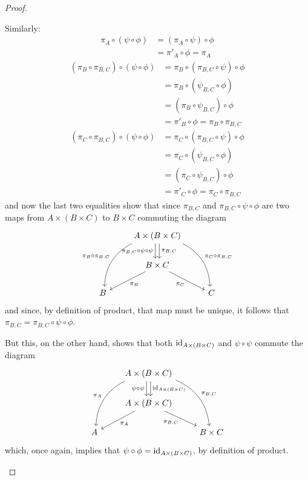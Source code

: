 \begin{proof}
\begin{enumerate}[(a)]
		Similarly:
		\begin{align*}
			\pi_A\circ(\psi\circ\phi)&=(\pi_A\circ\psi)\circ\phi\\
			&=\pi'_A\circ\phi=\pi_A
		\end{align*}
		\begin{align*}
			(\pi_B\circ\pi_{B,C})\circ(\psi\circ\phi)&=\pi_B\circ(\pi_{B,C}\circ\psi)\circ\phi\\
			&=\pi_B\circ(\psi_{B,C}\circ\phi)\\
			&=(\pi_B\circ\psi_{B,C})\circ\phi\\
			&=\pi'_B\circ\phi=\pi_B\circ\pi_{B,C}
		\end{align*}
		\begin{align*}
		(\pi_C\circ\pi_{B,C})\circ(\psi\circ\phi)&=\pi_C\circ(\pi_{B,C}\circ\psi)\circ\phi\\
		&=\pi_C\circ(\psi_{B,C}\circ\phi)\\
		&=(\pi_C\circ\psi_{B,C})\circ\phi\\
		&=\pi'_C\circ\phi=\pi_C\circ\pi_{B,C}
		\end{align*}and now the last two equalities show that since $\pi_{B,C}$ and $\pi_{B,C}\circ\psi\circ\phi$ are two maps from $A\times(B\times C)$ to $B\times C$ commuting the diagram
		\[\begin{tikzcd}
		& A\times(B\times C) \arrow[ldd, "{\pi_B\circ\pi_{B,C}}"', bend right] \arrow[d, "{\pi_{B,C}}",shift left] \arrow[rdd, "{\pi_C\circ\pi_{B,C}}", bend left] \arrow[d, "{\pi_{B,C}\circ\psi\circ\psi}"',shift right] &   \\
		& B\times C \arrow[ld, "\pi_B"] \arrow[rd, "\pi_C"']                                                                                                                                       &   \\
		B &                                                                                                                                                                                          & C
		\end{tikzcd}\]and since, by definition of product, that map must be unique, it follows that $\pi_{B,C}=\pi_{B,C}\circ\psi\circ\phi$.
		
		But this, on the other hand, shows that both ${\rm id}_{A\times(B\times C)}$ and $\psi\circ\psi$ commute the diagram
		\[\begin{tikzcd}
		& A\times(B\times C) \arrow[ldd, "\pi_A"', bend right] \arrow[d, "{\id_{A\times(B\times C)}}",shift left] \arrow[rdd, "{\pi_{B,C}}", bend left] \arrow[d, "\psi\circ\psi"',shift right] &           \\
		& A\times(B\times C) \arrow[ld, "\pi_A"] \arrow[rd, "{\pi_{B,C}}"']                                                                               &           \\
		A &                                                                                                                                                 & B\times C
		\end{tikzcd}\]which, once again, implies that $\psi\circ\phi={\rm id}_{A\times(B\times C)}$, by definition of product.
		

\end{enumerate}
\end{proof}
